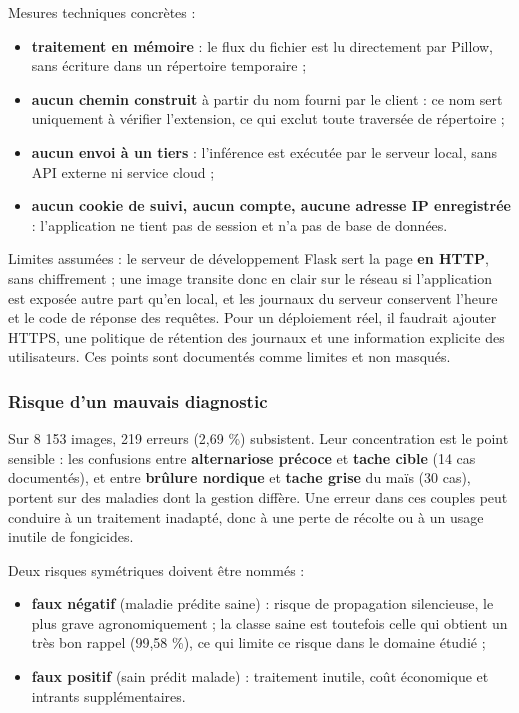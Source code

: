 \documentclass[10pt,a4paper]{article}
\begin{document}
Mesures techniques concrètes :

\begin{itemize}
\item \textbf{traitement en mémoire} : le flux du fichier est lu directement par Pillow, sans écriture dans un répertoire temporaire ;
\item \textbf{aucun chemin construit} à partir du nom fourni par le client : ce nom sert uniquement à vérifier l'extension, ce qui exclut toute traversée de répertoire ;
\item \textbf{aucun envoi à un tiers} : l'inférence est exécutée par le serveur local, sans API externe ni service cloud ;
\item \textbf{aucun cookie de suivi, aucun compte, aucune adresse IP enregistrée} : l'application ne tient pas de session et n'a pas de base de données.
\end{itemize}

Limites assumées : le serveur de développement Flask sert la page \textbf{en HTTP}, sans chiffrement ; une image transite donc en clair sur le réseau si l'application est exposée autre part qu'en local, et les journaux du serveur conservent l'heure et le code de réponse des requêtes. Pour un déploiement réel, il faudrait ajouter HTTPS, une politique de rétention des journaux et une information explicite des utilisateurs. Ces points sont documentés comme limites et non masqués.

\subsubsection{Risque d'un mauvais diagnostic}

Sur 8 153 images, 219 erreurs (2,69 \%) subsistent. Leur concentration est le point sensible : les confusions entre \textbf{alternariose précoce} et \textbf{tache cible} (14 cas documentés), et entre \textbf{brûlure nordique} et \textbf{tache grise} du maïs (30 cas), portent sur des maladies dont la gestion diffère. Une erreur dans ces couples peut conduire à un traitement inadapté, donc à une perte de récolte ou à un usage inutile de fongicides.

Deux risques symétriques doivent être nommés :

\begin{itemize}
\item \textbf{faux négatif} (maladie prédite saine) : risque de propagation silencieuse, le plus grave agronomiquement ; la classe saine est toutefois celle qui obtient un très bon rappel (99,58 \%), ce qui limite ce risque dans le domaine étudié ;
\item \textbf{faux positif} (sain prédit malade) : traitement inutile, coût économique et intrants supplémentaires.
\end{itemize}
\end{document}
